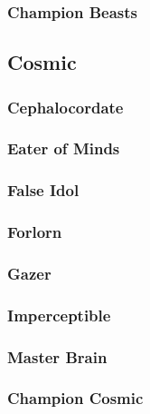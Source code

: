 \subsubsection{Champion Beasts}

\subsection{Cosmic}
\begin{multicols}{2}
    \subsubsection*{Cephalocordate}\label{foe:cephalocordate}
    \subsubsection*{Eater of Minds}\label{foe:eater-of-minds}
    \subsubsection*{False Idol}\label{foe:false-idol}
    \subsubsection*{Forlorn}\label{foe:forlorn}
    \subsubsection*{Gazer}\label{foe:gazer}
    \subsubsection*{Imperceptible}\label{foe:imperceptible}
    \subsubsection*{Master Brain}\label{foe:master-brain}
\end{multicols}
\subsubsection{Champion Cosmic}

